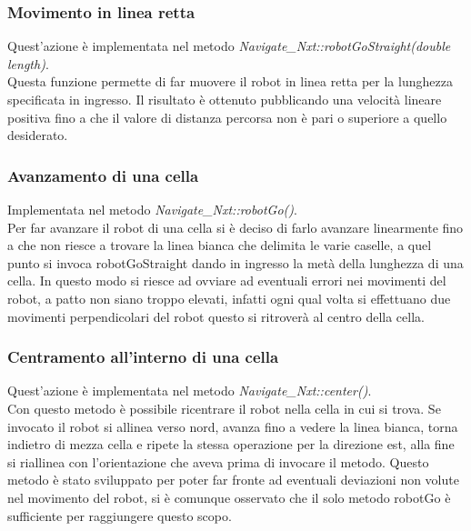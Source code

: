 \documentclass[english]{article}
\begin{document}
\subsubsection{Movimento in linea retta}
Quest'azione è implementata nel metodo \textit{Navigate\_Nxt::robotGoStraight(double length)}.\\
Questa funzione permette di far muovere il robot in linea retta per la lunghezza specificata in ingresso. Il risultato è ottenuto pubblicando una velocità lineare positiva fino a che il valore di distanza percorsa non è pari o superiore a quello desiderato.

\subsubsection{Avanzamento di una cella}
Implementata nel metodo \textit{Navigate\_Nxt::robotGo()}.\\
Per far avanzare il robot di una cella si è deciso di farlo avanzare linearmente fino a che non riesce a trovare la linea bianca che delimita le varie caselle, a quel punto si invoca robotGoStraight dando in ingresso la metà della lunghezza di una cella. In questo modo si riesce ad ovviare ad eventuali errori nei movimenti del robot, a patto non siano troppo elevati, infatti ogni qual volta si effettuano due movimenti perpendicolari del robot questo si ritroverà al centro della cella.

\subsubsection{Centramento all'interno di una cella}
Quest'azione è implementata nel metodo \textit{Navigate\_Nxt::center()}.\\
Con questo metodo è possibile ricentrare il robot nella cella in cui si trova. Se invocato il robot si allinea verso nord, avanza fino a vedere la linea bianca, torna indietro di mezza cella e ripete la stessa operazione per la direzione est, alla fine si riallinea con l'orientazione che aveva prima di invocare il metodo. Questo metodo è stato sviluppato per poter far fronte ad eventuali deviazioni non volute nel movimento del robot, si è comunque osservato che il solo metodo robotGo è sufficiente per raggiungere questo scopo.
\end{document}
